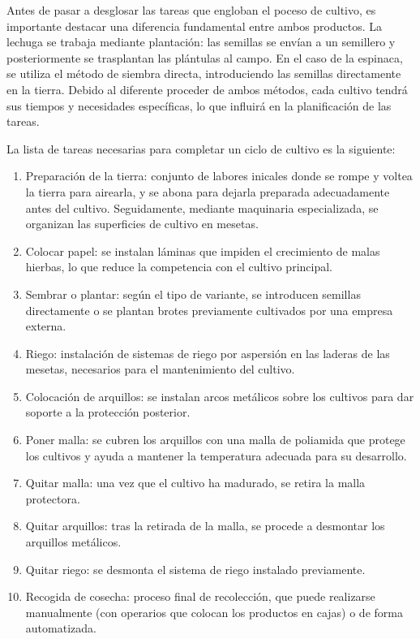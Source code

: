 Antes de pasar a desglosar las tareas que engloban el poceso de cultivo, es importante destacar una diferencia fundamental entre ambos productos.
La lechuga se trabaja mediante plantación: las semillas se envían a un semillero y posteriormente se trasplantan las plántulas al campo. 
En el caso de la espinaca, se utiliza el método de siembra directa, introduciendo las semillas directamente en la tierra.
Debido al diferente proceder de ambos métodos, cada cultivo tendrá sus tiempos y necesidades específicas, lo que influirá en la planificación de las tareas.

La lista de tareas necesarias para completar un ciclo de cultivo es la siguiente:
\begin{enumerate}
    \item Preparación de la tierra: conjunto de labores inicales donde se rompe y voltea la tierra para airearla, y se abona para dejarla preparada adecuadamente antes del cultivo.
          Seguidamente, mediante maquinaria especializada, se organizan las superficies de cultivo en mesetas.
    \item Colocar papel: se instalan láminas que impiden el crecimiento de malas hierbas, lo que reduce la competencia con el cultivo principal.
    \item Sembrar o plantar: según el tipo de variante, se introducen semillas directamente o se plantan brotes previamente cultivados por una empresa externa.
    \item Riego: instalación de sistemas de riego por aspersión en las laderas de las mesetas, necesarios para el mantenimiento del cultivo.
    \item Colocación de arquillos: se instalan arcos metálicos sobre los cultivos para dar soporte a la protección posterior.
    \item Poner malla: se cubren los arquillos con una malla de poliamida que protege los cultivos y ayuda a mantener la temperatura adecuada para su desarrollo.
    \item Quitar malla: una vez que el cultivo ha madurado, se retira la malla protectora.
    \item Quitar arquillos: tras la retirada de la malla, se procede a desmontar los arquillos metálicos.
    \item Quitar riego: se desmonta el sistema de riego instalado previamente.
    \item Recogida de cosecha: proceso final de recolección, que puede realizarse manualmente (con operarios que colocan los productos en cajas) o de forma automatizada.
\end{enumerate}

